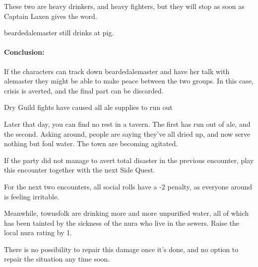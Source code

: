 \begin{multicols}{2}


These two are heavy drinkers, and heavy fighters, but they will stop as soon as Captain Laxen gives the word.


\Gls{beardedalemaster} still drinks at \gls{pig}.  

\paragraph{Conclusion:} If the characters can track down \gls{beardedalemaster} and have her talk with \gls{alemaster} they might be able to make peace between the two groups.
In this case, crisis is averted, and the final part can be discarded.

\beardedalemaster

{\N Dry}%
{Guild fights have caused all ale supplies to run out}%

\begin{boxtext}

	Later that day, you can find no rest in a tavern.  The first has run out of ale, and the second.  Asking around, people are saying they've all dried up, and now serve nothing but foul water.  The town are becoming agitated.

\end{boxtext}

If the party did not manage to avert total disaster in the previous encounter, play this encounter together with the next Side Quest.

For the next two encounters, all social rolls have a -2 penalty, as everyone around is feeling irritable.

Meanwhile, townsfolk are drinking more and more unpurified water, all of which has been tainted by the sickness of the nura who live in the sewers.  Raise the local nura rating by 1.

There is no possibility to repair this damage once it's done, and no option to repair the situation any time soon.

\stopcontents[sq]

\label{randommeetings}

\startcontents[sq]

\sqminitoc


\end{multicols}

